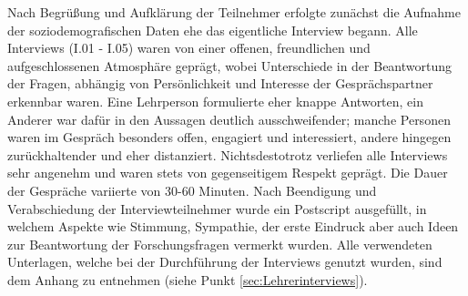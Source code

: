 Nach Begrüßung und Aufklärung der Teilnehmer erfolgte zunächst die Aufnahme der soziodemografischen Daten ehe das eigentliche Interview begann. Alle Interviews (I.01 - I.05) waren von einer offenen, freundlichen und aufgeschlossenen Atmosphäre geprägt, wobei Unterschiede in der Beantwortung der Fragen, abhängig von Persönlichkeit und Interesse der Gesprächspartner erkennbar waren. Eine Lehrperson formulierte eher knappe Antworten, ein Anderer war dafür in den Aussagen deutlich ausschweifender; manche Personen waren im Gespräch besonders offen, engagiert und interessiert, andere hingegen zurückhaltender und eher distanziert. Nichtsdestotrotz verliefen alle Interviews sehr angenehm und waren stets von gegenseitigem Respekt geprägt. Die Dauer der Gespräche variierte von 30-60 Minuten. Nach Beendigung und Verabschiedung der Interviewteilnehmer wurde ein Postscript ausgefüllt, in welchem Aspekte wie Stimmung, Sympathie, der erste Eindruck aber auch Ideen zur Beantwortung der Forschungsfragen vermerkt wurden. Alle verwendeten Unterlagen, welche bei der Durchführung der Interviews genutzt wurden, sind dem Anhang zu entnehmen (siehe Punkt \ref{sec:Lehrerinterviews}).
